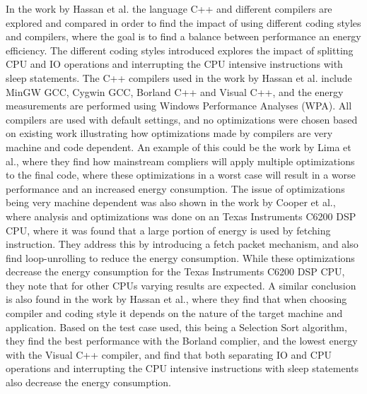 In the work by Hassan et al.\cite{hassan2017} the language C++ and different compilers are explored and compared in order to find the impact of using different coding styles and compilers, where the goal is to find a balance between performance an energy efficiency. The different coding styles introduced explores the impact of splitting CPU and IO operations and interrupting the CPU intensive instructions with sleep statements. The C++ compilers used in the work by Hassan et al.\cite{hassan2017} include MinGW GCC, Cygwin GCC, Borland C++ and Visual C++, and the energy measurements are performed using Windows Performance Analyses (WPA). All compilers are used with default settings, and no optimizations were chosen based on existing work illustrating how optimizations made by compilers are very machine and code dependent\cite{lima2013}. An example of this could be the work by Lima et al.\cite{lima2013}, where they find how mainstream compliers will apply multiple optimizations to the final code, where these optimizations in a worst case will result in a worse performance and an increased energy consumption. The issue of optimizations being very machine dependent was also shown in the work by Cooper et al.\cite{cooper2004}, where analysis and optimizations was done on an Texas Instruments C6200 DSP CPU, where it was found that a large portion of energy is used by fetching instruction. They address this by introducing a fetch packet mechanism, and also find loop-unrolling to reduce the energy consumption. While these optimizations decrease the energy consumption for the Texas Instruments C6200 DSP CPU, they note that for other CPUs varying results are expected. A similar conclusion is also found in the work by Hassan et al.\cite{hassan2017}, where they find that when choosing compiler and coding style it depends on the nature of the target machine and application. Based on the test case used, this being a Selection Sort algorithm, they find the best performance with the Borland complier, and the lowest energy with the Visual C++ compiler, and find that both separating IO and CPU operations and interrupting the CPU intensive instructions with sleep statements also decrease the energy consumption.